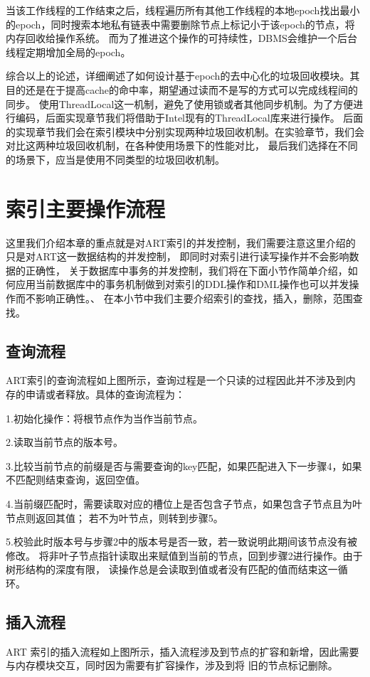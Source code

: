 当该工作线程的工作结束之后，线程遍历所有其他工作线程的本地epoch找出最小的epoch，同时搜索本地私有链表中需要删除节点上标记小于该epoch的节点，将内存回收给操作系统。
而为了推进这个操作的可持续性，DBMS会维护一个后台线程定期增加全局的epoch。

综合以上的论述，详细阐述了如何设计基于epoch的去中心化的垃圾回收模块。其目的还是在于提高cache的命中率，期望通过读而不是写的方式可以完成线程间的同步。
使用ThreadLocal这一机制，避免了使用锁或者其他同步机制。为了方便进行编码，后面实现章节我们将借助于Intel现有的ThreadLocal库来进行操作。
后面的实现章节我们会在索引模块中分别实现两种垃圾回收机制。在实验章节，我们会对比这两种垃圾回收机制，在各种使用场景下的性能对比，
最后我们选择在不同的场景下，应当是使用不同类型的垃圾回收机制。

\section{索引主要操作流程}
这里我们介绍本章的重点就是对ART索引的并发控制，我们需要注意这里介绍的只是对ART这一数据结构的并发控制，
即同时对索引进行读写操作并不会影响数据的正确性，
关于数据库中事务的并发控制，我们将在下面小节作简单介绍，如何应用当前数据库中的事务机制做到对索引的DDL操作和DML操作也可以并发操作而不影响正确性。、
在本小节中我们主要介绍索引的查找，插入，删除，范围查找。

\subsection{查询流程}
ART索引的查询流程如上图所示，查询过程是一个只读的过程因此并不涉及到内存的申请或者释放。具体的查询流程为：

1.初始化操作：将根节点作为当作当前节点。

2.读取当前节点的版本号。

3.比较当前节点的前缀是否与需要查询的key匹配，如果匹配进入下一步骤4，如果不匹配则结束查询，返回空值。

4.当前缀匹配时，需要读取对应的槽位上是否包含子节点，如果包含子节点且为叶节点则返回其值；
若不为叶节点，则转到步骤5。

5.校验此时版本号与步骤2中的版本号是否一致，若一致说明此期间该节点没有被修改。
将非叶子节点指针读取出来赋值到当前的节点，回到步骤2进行操作。由于树形结构的深度有限，
读操作总是会读取到值或者没有匹配的值而结束这一循环。

\subsection{插入流程}
ART 索引的插入流程如上图所示，插入流程涉及到节点的扩容和新增，因此需要与内存模块交互，同时因为需要有扩容操作，涉及到将
旧的节点标记删除。

